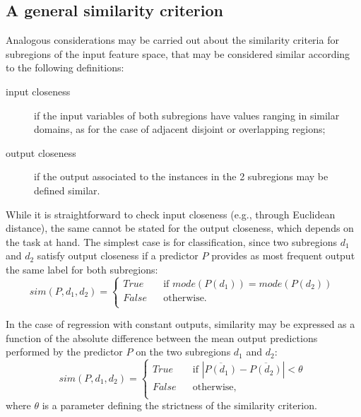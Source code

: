 \documentclass[
]{ceurart}
\begin{document}
%
%

\subsection{A general similarity criterion}

Analogous considerations may be carried out about the similarity criteria for subregions of the input feature space, that may be considered similar according to the following definitions:
%
\begin{description}
	\item[input closeness] if the input variables of both subregions have values ranging in similar domains, as for the case of adjacent disjoint or overlapping regions;
	\item [output closeness] if the output associated to the instances in the 2 subregions may be defined similar.
\end{description}
%
While it is straightforward to check input closeness (e.g., through Euclidean distance), the same cannot be stated for the output closeness, which depends on the task at hand.
%
The simplest case is for classification, since two subregions $d_1$ and $d_2$ satisfy output closeness if a predictor $P$ provides as most frequent output the same label for both subregions:
%
\begin{equation}
	sim(P, d_1, d_2) = 
	\begin{cases}
		True \text{~~~~~~if~} mode(P(d_1)) = mode(P(d_2))\\
		False \text{~~~~~otherwise}.\\
	\end{cases}\,\label{eq:simClass}
\end{equation}

In the case of regression with constant outputs, similarity may be expressed as a function of the absolute difference between the mean output predictions performed by the predictor $P$ on the two subregions $d_1$ and $d_2$:
%
\begin{equation}
	sim(P, d_1, d_2) = 
	\begin{cases}
		True \text{~~~~~~if~} |\overline{P(d_1)} - \overline{P(d_2)}| < \theta\\
		False \text{~~~~~otherwise},\\
	\end{cases}\,\label{eq:simRegK}
\end{equation}
%
where $\theta$ is a parameter defining the strictness of the similarity criterion.
\end{document}
